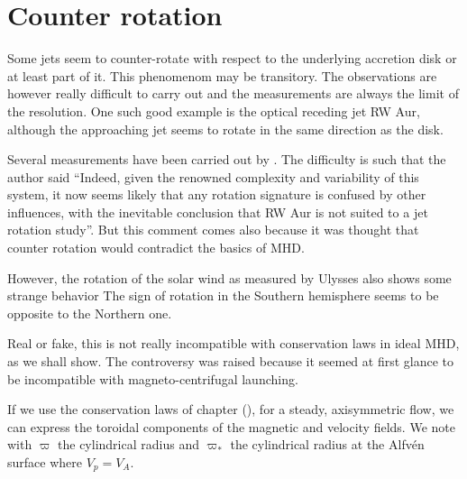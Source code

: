\documentclass[10pt,a4paper,english]{article}
\begin{document}
\section{Counter rotation}
\label{sec:counter_rotation}
Some jets seem to counter-rotate with respect to the underlying accretion disk or at least part of it. This phenomenom may be transitory. The observations are however really difficult to carry out and the measurements are always the limit of the resolution. One such good example is the optical receding jet RW Aur, although the approaching jet seems to rotate in the same direction as the disk.

Several measurements have been carried out by \cite{2012ApJ...749..139C}. The difficulty is such that the author said ``Indeed, given the renowned complexity and variability of this system, it now seems likely that any rotation signature is confused by other influences, with the inevitable conclusion that RW Aur is not suited to a jet rotation study''. But this comment comes also because it was thought that counter rotation would contradict the basics of MHD.

However, the rotation of the solar wind as measured by Ulysses also shows some strange behavior The sign of rotation in the Southern hemisphere seems to be opposite to the Northern one.

Real or fake, this is not really incompatible with conservation laws in ideal MHD, as we shall show. The controversy was raised because it seemed at first glance to be incompatible with magneto-centrifugal launching.


If we use the conservation laws of chapter (), for a steady, axisymmetric flow, we can express the toroidal components of the magnetic and velocity fields. We note with $\varpi$ the cylindrical radius and $\varpi_*$ the cylindrical radius at the Alfvén surface where $V_p = V_A$.
\end{document}
